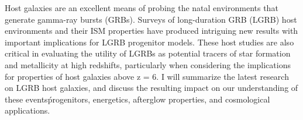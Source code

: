 


\bigskip



\bigskip

\noindent Host galaxies are an excellent means of probing the natal environments that generate gamma-ray bursts (GRBs). Surveys of long-duration GRB (LGRB) host environments and their ISM properties have produced intriguing new results with important implications for LGRB progenitor models. These host studies are also critical in evaluating the utility of LGRBs as potential tracers of star formation and metallicity at high redshifts, particularly when considering the implications for properties of host galaxies above z = 6. I will summarize the latest research on LGRB host galaxies, and discuss the resulting impact on our understanding of these events\' progenitors, energetics, afterglow properties, and cosmological applications.

